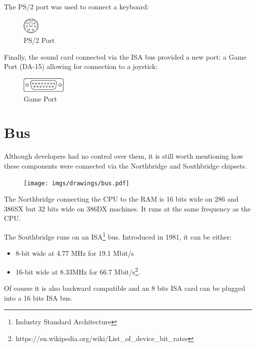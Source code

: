\documentclass[book.tex]{subfiles}
\begin{document}
The PS/2 port was used to connect a keyboard:
 \begin{figure}[H]
\centering
\includegraphics[width=0.07\textwidth]{imgs/drawings/ports/MiniDIN-6_PS2.eps}
\caption{PS/2 Port}
\label{fig:ps2Port}
\end{figure}


Finally, the sound card connected via the ISA bus provided a new port: a Game Port (DA-15) allowing for connection to a joystick:
 \begin{figure}[H]
\centering
\includegraphics[width=0.19\textwidth]{imgs/drawings/ports/DA-15_GamePort.eps}
\caption{Game Port}
\label{fig:gamePort}
\end{figure}


\section{Bus}
Although developers had no control over them, it is still worth mentioning how these components were connected via the Northbridge and Southbridge chipsets.\\ 
\par
\begin{figure}[H]
\centering
      \texttt{[image: imgs/drawings/bus.pdf]}
\end{figure}
\par
The Northbridge connecting the CPU to the RAM is 16 bits wide on 286 and 386SX but 32 bits wide on 386DX machines. It runs at the same frequency as the CPU.\\
\par
The Southbridge runs on an ISA\footnote{Industry Standard Architecture} bus. Introduced in 1981, it can be either:
\begin{itemize}
\item 8-bit wide at 4.77 MHz  for 19.1 Mbit/s
\item 16-bit wide at 8.33MHz for 66.7 Mbit/s\footnote{https://en.wikipedia.org/wiki/List\_of\_device\_bit\_rates}.
\end{itemize}
Of course it is also backward compatible and an 8 bits ISA card can be plugged into a 16 bits ISA bus.\\
\par
\end{document}

